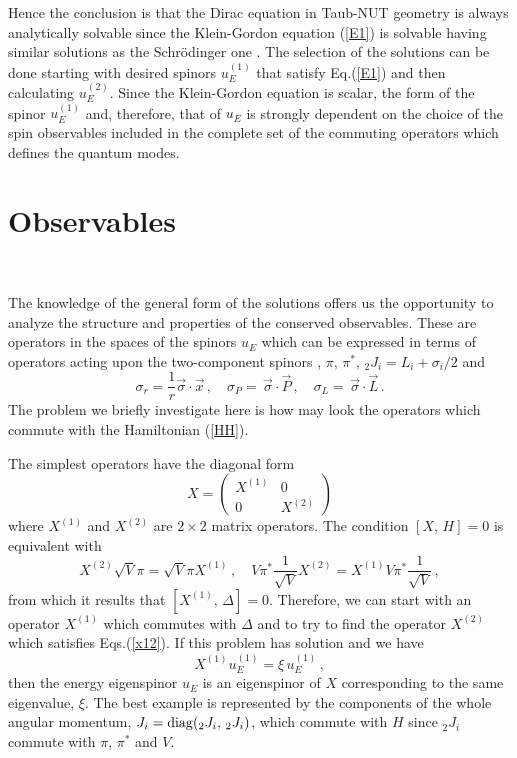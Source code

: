 \documentclass[a4paper,12pt]{article}
\begin{document}
Hence the  conclusion is that the Dirac equation in  Taub-NUT geometry  
is always analytically solvable since the Klein-Gordon equation (\ref{E1}) is 
solvable having similar solutions as the Schr\" odinger one \cite{CV}. The 
selection of the solutions can be done  starting with desired  
spinors $u^{(1)}_{E}$ that satisfy Eq.(\ref{E1}) and then calculating 
$u^{(2)}_{E}$. Since the Klein-Gordon equation is scalar, the form of the 
spinor  $u^{(1)}_{E}$ and, therefore, that of $u_{E}$ is strongly dependent on 
the choice of the spin observables included in the complete set of the 
commuting operators which defines the quantum modes.    


\section{Observables}
\

The knowledge of the general form of the solutions  offers us the 
opportunity to analyze the structure and  properties of the 
conserved observables. These are operators in the spaces of the spinors 
$u_{E}$ which can be expressed in terms  of operators acting upon the 
two-component spinors \cite{DYON}, $\pi,\,\pi^{*},\,_{2}J_{i}=
L_{i}+\sigma_{i}/2$ and 
\begin{equation}
\sigma_{r}=\frac{1}{r}\vec{\sigma}\cdot\vec{x}\,,\quad
\sigma_{P}=\,\vec{\sigma}\cdot\vec{P}\,,\quad
\sigma_{L}=\,\vec{\sigma}\cdot\vec{L}\,.
\end{equation}
The problem we briefly investigate here is how may look the 
operators which commute with the  Hamiltonian (\ref{HH}). 

The simplest operators have the diagonal form 
\begin{equation}
X=\left(
\begin{array}{cc}
X^{(1)}&0\\
0&X^{(2)}
\end{array}\right)
\end{equation}
where $X^{(1)}$ and $X^{(2)}$ are $2\times 2$ matrix operators.
The condition $[X,\,H]=0$ is equivalent with
\begin{equation}\label{x12}
X^{(2)}\sqrt{V}\pi=\sqrt{V} \pi X^{(1)}
\,,\quad V\pi^{*}\frac{1}{\sqrt{V}}X^{(2)}=
X^{(1)}V\pi^{*}\frac{1}{\sqrt{V}}\,,
\end{equation}
from which it results that $[X^{(1)},\,\Delta]=0$. Therefore, we can start 
with an operator $X^{(1)}$ which commutes with $\Delta$ and to try to find 
the operator $X^{(2)}$ which satisfies Eqs.(\ref{x12}). If this problem 
has solution and  we have
\begin{equation}\label{Xxiu}
X^{(1)}u^{(1)}_{E}=\xi\, u_{E}^{(1)}\,,
\end{equation}
then the energy eigenspinor $u_{E}$ is an eigenspinor of  
$X$  corresponding to the same eigenvalue, $\xi$. The best example is 
represented by the components of the whole angular momentum, 
$J_{i}={\rm diag}(_{2}J_{i},\,_{2}J_{i})$, which commute with 
$H$ since $_{2}J_{i}$ commute with $\pi$, $\pi^{*}$ and $V$.     
\end{document}
